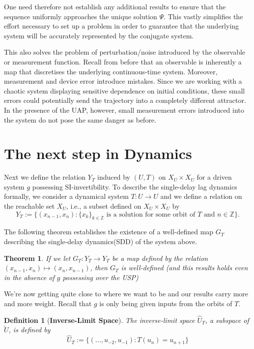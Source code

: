 \documentclass[a4paper,12pt,twoside]{book}
\newtheorem{Definition}{Definition}[]
\newtheorem{Theorem}{Theorem}[]
\begin{document}
One need therefore not establish any additional results to ensure that the sequence uniformly approaches the unique solution $\Psi$. This vastly simplifies the effort necessary to set up a problem in order to guarantee that the underlying system will be accurately represented by the conjugate system.

This also solves the problem of perturbation/noise introduced by the observable or measurement function. Recall from before that an observable is inherently a map that discretises the underlying continuous-time system. Moreover, measurement and device error introduce mistakes. Since we are working with a chaotic system displaying sensitive dependence on initial conditions, these small errors could potentially send the trajectory into a completely different attractor. In the presence of the UAP, however, small measurement errors introduced into the system do not pose the same danger as before.

\section{The next step in Dynamics}

Next we define the relation $Y_T$ induced by $(U,T)$ on $X_U\times{X_U}$ for a driven system $g$ possessing SI-invertibility.  To describe the  single-delay lag dynamics formally, we consider a dynamical system $T: U \to U$ and we define a relation on the reachable set $X_U$, i.e., a subset defined on $X_U \times X_U$ by 
$$Y_T:=\{(x_{n-1},x_n): \{x_k\}_{k\in \mathbb{Z}} \mbox{ is a solution for some orbit of } T \mbox{ and } n \in \mathbb{Z}\}.$$ 

The following theorem establishes the existence of a well-defined map $G_T$ describing the single-delay dynamics(SDD) of the system above. 

\begin{Theorem}
If we let $G_T:Y_T\to{Y_T}$ be a map defined by the relation $(x_{n-1},x_n)\mapsto(x_n,x_{n-1})$, then $G_T$ is well-defined (and this results holds even in the absence of $g$ possessing over the USP)  
\end{Theorem}

We're now getting quite close to where we want to be and our results carry more and more weight. Recall that $g$ is only being given inputs from the orbits of $T$.  

\begin{Definition}
  [\bf Inverse-Limit Space]\label{Dfn_InvLimSpace}
  The inverse-limit space $\widehat{U}_T$, a subspace of $\overleftarrow{U}$, is defined by $$\widehat{U}_T:=\{(\ldots, u_{-2}, u_{-1}):T(u_n)=u_{n+1}\}$$ 
\end{Definition}
\end{document}
